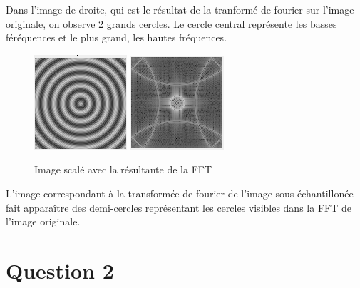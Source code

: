 \documentclass[a4paper,12pt]{report}
\begin{document}
Dans l'image de droite, qui est le résultat de la tranformé de fourier sur l'image originale, on observe 2 grands cercles. Le cercle central représente les basses féréquences et le plus grand, les hautes fréquences.

\begin{figure}[!ht]
	\center	\includegraphics[scale=1]{image/q1_scale.png}	\includegraphics[scale=1]{image/q1_FFT_scale.png}
	\caption{Image scalé avec la résultante de la FFT}
\end{figure} 

L'image correspondant à la transformée de fourier de l'image sous-échantillonée fait apparaître des demi-cercles représentant les cercles visibles dans la FFT de l'image originale.

\newpage

\section*{Question 2}
\end{document}

